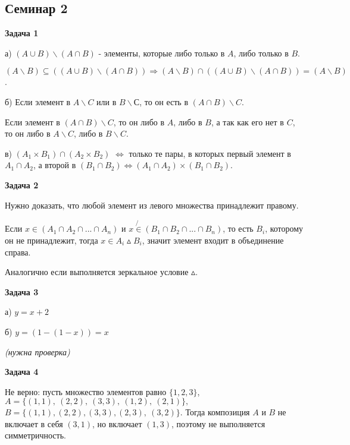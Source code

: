 \subsection{Семинар 2}
\begin{center}
\textbf{Задача 1}
\end{center}
а) $\displaystyle ( A\cup B) \backslash ( A\cap B)$ - элементы, которые либо только в $\displaystyle A$, либо только в $\displaystyle B$.

$\displaystyle ( A\backslash B) \subseteq (( A\cup B) \backslash ( A\cap B)) \Longrightarrow ( A\backslash B) \cap (( A\cup B) \backslash ( A\cap B)) =( A\backslash B)$.

б) Если элемент в $\displaystyle A\backslash C$ или в $\displaystyle B\backslash С$, то он есть в $\displaystyle ( A\cap B) \backslash C$.

Если элемент в $\displaystyle ( A\cap B) \backslash C$, то он либо в $\displaystyle A$, либо в $\displaystyle B$, а так как его нет в $\displaystyle C$, то он либо в $\displaystyle A\backslash C$, либо в $\displaystyle B\backslash C$.

в) $\displaystyle ( A_{1} \times B_{1}) \cap ( A_{2} \times B_{2})$ $\displaystyle \Leftrightarrow $ только те пары, в которых первый элемент в $\displaystyle A_{1} \cap A_{2}$, а второй в $\displaystyle ( B_{1} \cap B_{2})$$\displaystyle \Leftrightarrow $$\displaystyle ( A_{1} \cap A_{2}) \times ( B_{1} \cap B_{2})$.

\begin{center}
\textbf{Задача 2}
\end{center}
Нужно доказать, что любой элемент из левого множества принадлежит правому.

Если $\displaystyle x\in ( A_{1} \cap A_{2} \cap ...\cap A_{n})$ и $\displaystyle x\not{\in }( B_{1} \cap B_{2} \cap ...\cap B_{n})$, то есть $\displaystyle B_{i}$, которому он не принадлежит, тогда $\displaystyle x\in A_{i} \vartriangle B_{i}$, значит элемент входит в объединение справа.

Аналогично если выполняется зеркальное условие $\displaystyle \vartriangle $.

\begin{center}
\textbf{Задача 3}
\end{center}
а) $\displaystyle y=x+2$

б) $\displaystyle y=( 1-( 1-x)) =x$

\textit{(нужна проверка)}

\begin{center}
\textbf{Задача 4}
\end{center}
Не верно: пусть множество элементов равно $\displaystyle \{1,2,3\}$, $\displaystyle A=\{( 1,1) ,\ ( 2,2) ,\ ( 3,3) ,\ ( 1,2) ,\ ( 2,1)\} ,$ $\displaystyle B=\{( 1,1) ,( 2,2) ,( 3,3) ,( 2,3) ,\ ( 3,2)\}$. Тогда композиция $\displaystyle A$ и $\displaystyle B$ не включает в себя $\displaystyle ( 3,1)$, но включает $\displaystyle ( 1,3)$, поэтому не выполняется симметричность.

